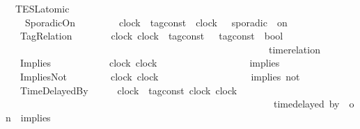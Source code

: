 \begin{isabellebody}
\isamarkupfalse%
\ {\isacharprime}{\isasymtau}\ TESL{\isacharunderscore}atomic\ {\isacharequal}\isanewline
\ \ \ \ SporadicOn\ \ \ \ \ \ \ \ \ {\isacartoucheopen}clock{\isacartoucheclose}\ {\isacartoucheopen}{\isacharprime}{\isasymtau}\ tag{\isacharunderscore}const{\isacartoucheclose}\ \ {\isacartoucheopen}clock{\isacartoucheclose}\ \ {\isacharparenleft}{\isacartoucheopen}{\isacharunderscore}\ sporadic\ {\isacharunderscore}\ on\ {\isacharunderscore}{\isacartoucheclose}\ {}{}{\isacharparenright}\isanewline
\ \ {\isacharbar}\ TagRelation\ \ \ \ \ \ \ \ {\isacartoucheopen}clock{\isacartoucheclose}\ {\isacartoucheopen}clock{\isacartoucheclose}\ {\isacartoucheopen}{\isacharparenleft}{\isacharprime}{\isasymtau}\ tag{\isacharunderscore}const\ {\isasymtimes}\ {\isacharprime}{\isasymtau}\ tag{\isacharunderscore}const{\isacharparenright}\ {\isasymRightarrow}\ bool{\isacartoucheclose}\ \isanewline
\ \ \ \ \ \ \ \ \ \ \ \ \ \ \ \ \ \ \ \ \ \ \ \ \ \ \ \ \ \ \ \ \ \ \ \ \ \ \ \ \ \ \ \ \ \ \ \ \ \ \ \ \ \ {\isacharparenleft}{\isacartoucheopen}time{\isacharminus}relation\ {\isasymlfloor}{\isacharunderscore}{\isacharcomma}\ {\isacharunderscore}{\isasymrfloor}\ {\isasymin}\ {\isacharunderscore}{\isacartoucheclose}\ {}{}{\isacharparenright}\isanewline
\ \ {\isacharbar}\ Implies\ \ \ \ \ \ \ \ \ \ \ \ {\isacartoucheopen}clock{\isacartoucheclose}\ {\isacartoucheopen}clock{\isacartoucheclose}\ \ \ \ \ \ \ \ \ \ \ \ \ \ \ \ \ \ {\isacharparenleft}\ {\isacartoucheopen}implies{\isacartoucheclose}\ {}{}{\isacharparenright}\isanewline
\ \ {\isacharbar}\ ImpliesNot\ \ \ \ \ \ \ \ \ {\isacartoucheopen}clock{\isacartoucheclose}\ {\isacartoucheopen}clock{\isacartoucheclose}\ \ \ \ \ \ \ \ \ \ \ \ \ \ \ \ \ \ {\isacharparenleft}\ {\isacartoucheopen}implies\ not{\isacartoucheclose}\ {}{}{\isacharparenright}\isanewline
\ \ {\isacharbar}\ TimeDelayedBy\ \ \ \ \ \ {\isacartoucheopen}clock{\isacartoucheclose}\ {\isacartoucheopen}{\isacharprime}{\isasymtau}\ tag{\isacharunderscore}const{\isacartoucheclose}\ {\isacartoucheopen}clock{\isacartoucheclose}\ {\isacartoucheopen}clock{\isacartoucheclose}\isanewline
\ \ \ \ \ \ \ \ \ \ \ \ \ \ \ \ \ \ \ \ \ \ \ \ \ \ \ \ \ \ \ \ \ \ \ \ \ \ \ \ \ \ \ \ \ \ \ \ \ \ \ \ \ \ {\isacharparenleft}{\isacartoucheopen}{\isacharunderscore}\ time{\isacharminus}delayed\ by\ {\isacharunderscore}\ on\ {\isacharunderscore}\ implies\ {\isacharunderscore}{\isacartoucheclose}\ {}{}{\isacharparenright}\isanewline

\end{isabellebody}
